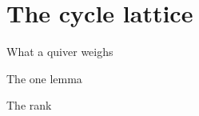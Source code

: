 \section{The cycle lattice}\label{sh-0011}

\begin{frame}{What a quiver weighs}

\end{frame}

\begin{frame}{The one lemma}

\end{frame}

\begin{frame}{The rank}

\end{frame}

